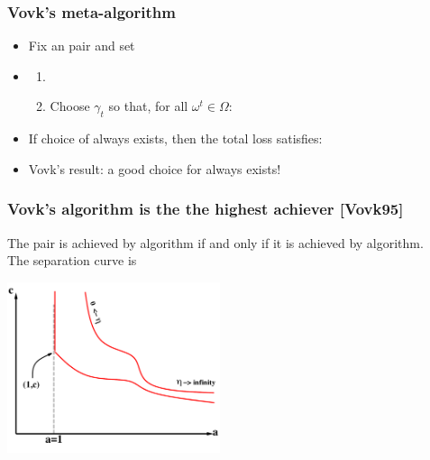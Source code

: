 \documentclass[handout]{beamer}
\begin{document}
\begin{frame}
\frametitle{Vovk's meta-algorithm}
\begin{itemize}
\item Fix an  pair  and set 
\item \begin{enumerate}
\item
{}
\item
Choose $\gamma_t$ so that, for all $\omega^t \in \Omega$:
\end{enumerate}
\item
If choice of  always exists, then the total loss satisfies:
\item
Vovk's result:  a good choice for  always exists!
\end{itemize}
\end{frame}

\begin{frame}
\frametitle{Vovk's algorithm is the the highest achiever {\color{green} [Vovk95]}}

The pair  is achieved by  algorithm 
if and only if it is achieved by  algorithm.
\pause \\
The separation curve is
\pause
\begin{center}
\includegraphics[height=5cm]{figures/achievable2.pdf}
\end{center}
\end{frame}
\end{document}
